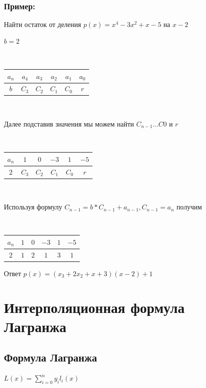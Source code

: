 \documentclass[12pt]{article}
\begin{document}
    \subsubsection{Пример:}
    Найти остаток от деления $p(x) = x^{4} - 3x^{2} + x -5$ на $x-2$\par
    $b=2$\par
    $ $\par
    \begin{tabular}{ |c|c|c|c|c|c| }
        \hline
        $a_{n}$ & $a_{4}$ & $a_{3}$ & $a_{2}$ & $a_{1}$ & $a_{0}$ \\
        \hline
        \hline
        $b$     & $C_{3}$ & $C_{2}$ & $C_{1}$ & $C_{0}$ & $r$     \\
        \hline
    \end{tabular}\par
    $ $\par
    Далее подставив значения мы можем найти $C_{n-1} ... C{0}$ и $r$\par
    $ $\par
    \begin{tabular}{ |c|c|c|c|c|c| }
        \hline
        $a_{n}$ & $1$     & $0$     & $-3$    & $1$     & $-5$ \\
        \hline
        \hline
        $2$     & $C_{3}$ & $C_{2}$ & $C_{1}$ & $C_{0}$ & $r$  \\
        \hline
    \end{tabular}\par
    $ $\par
    Используя формулу $C_{n-1} = b*C_{n-1}+a_{n-1},C_{n-1}=a_{n}$ получим\par
    $ $\par
    \begin{tabular}{ |c|c|c|c|c|c| }
        \hline
        $a_{n}$ & $1$ & $0$ & $-3$ & $1$ & $-5$ \\
        \hline
        \hline
        $2$     & $1$ & $2$ & $1$  & $3$ & $1$  \\
        \hline
    \end{tabular}\par
    Ответ $p(x) =(x_{3} + 2x_{2} + x +3)(x-2) + 1$

    \setcounter{section}{10}
    \section{Интерполяционная формула Лагранжа}

    \subsection{Формула Лагранжа}
    $L(x) = \sum_{i=0}^n y_i l_i(x)$
\end{document}
